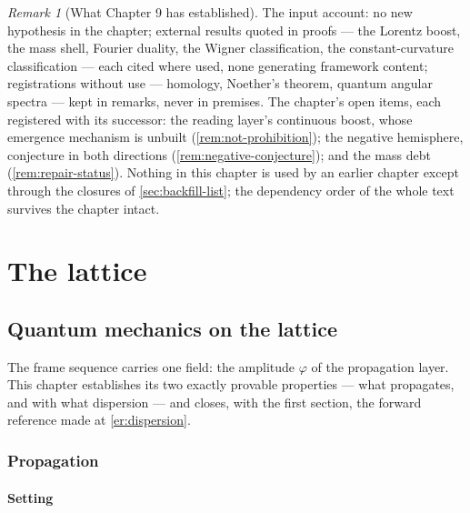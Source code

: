 \documentclass[11pt]{amsbook}
\theoremstyle{plain}
\theoremstyle{definition}
\theoremstyle{remark}
\newtheorem{remark}[theorem]{Remark}
\begin{document}
\begin{remark}[What Chapter 9 has established]
The input account: no new hypothesis in the chapter; external results quoted in proofs --- the Lorentz boost, the mass shell, Fourier duality, the Wigner classification, the constant-curvature classification --- each cited where used, none generating framework content; registrations without use --- homology, Noether's theorem, quantum angular spectra --- kept in remarks, never in premises. The chapter's open items, each registered with its successor: the reading layer's continuous boost, whose emergence mechanism is unbuilt (\cref{rem:not-prohibition}); the negative hemisphere, conjecture in both directions (\cref{rem:negative-conjecture}); and the mass debt (\cref{rem:repair-status}). Nothing in this chapter is used by an earlier chapter except through the closures of \cref{sec:backfill-list}; the dependency order of the whole text survives the chapter intact.
\end{remark}

\part{The lattice}

\chapter{Quantum mechanics on the lattice}\label{ch:lattice}

The frame sequence carries one field: the amplitude $\varphi$ of the propagation layer. This chapter establishes its two exactly provable properties --- what propagates, and with what dispersion --- and closes, with the first section, the forward reference made at \cref{er:dispersion}.

\section{Propagation}\label{sec:propagation}

\subsection{Setting}\label{sec:exit-line}
\end{document}
